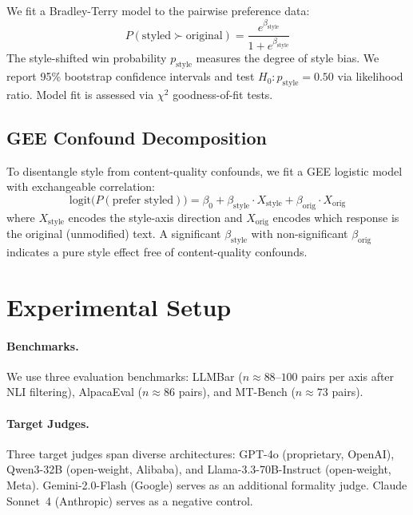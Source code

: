 \documentclass[11pt]{article}
\begin{document}
We fit a Bradley-Terry model to the pairwise preference data:
\begin{equation}
P(\text{styled} \succ \text{original}) = \frac{e^{\beta_\text{style}}}{1 + e^{\beta_\text{style}}}
\end{equation}
The style-shifted win probability $p_\text{style}$ measures the degree of style bias.
We report 95\% bootstrap confidence intervals and test $H_0: p_\text{style} = 0.50$ via likelihood ratio.
Model fit is assessed via $\chi^2$ goodness-of-fit tests.

\subsection{GEE Confound Decomposition}

To disentangle style from content-quality confounds, we fit a GEE logistic model with exchangeable correlation:
\begin{equation}
\text{logit}\bigl(P(\text{prefer styled})\bigr) = \beta_0 + \beta_{\text{style}} \cdot X_{\text{style}} + \beta_{\text{orig}} \cdot X_{\text{orig}}
\end{equation}
where $X_\text{style}$ encodes the style-axis direction and $X_\text{orig}$ encodes which response is the original (unmodified) text.
A significant $\beta_\text{style}$ with non-significant $\beta_\text{orig}$ indicates a pure style effect free of content-quality confounds.

\section{Experimental Setup}

\paragraph{Benchmarks.}
We use three evaluation benchmarks: LLMBar \cite{zeng2024llmbar} ($n \approx 88$--$100$ pairs per axis after NLI filtering), AlpacaEval \cite{li2024alpacaeval} ($n \approx 86$ pairs), and MT-Bench \cite{zheng2024chatbot} ($n \approx 73$ pairs).

\paragraph{Target Judges.}
Three target judges span diverse architectures: GPT-4o (proprietary, OpenAI), Qwen3-32B (open-weight, Alibaba), and Llama-3.3-70B-Instruct (open-weight, Meta).
Gemini-2.0-Flash (Google) serves as an additional formality judge.
Claude Sonnet~4 (Anthropic) serves as a negative control.
\end{document}

